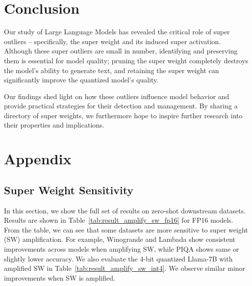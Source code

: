 \documentclass{article} %
\begin{document}
\section{Conclusion}

Our study of Large Language Models has revealed the critical role of super outliers -- specifically, the super weight and its induced super activation. Although these super outliers are small in number, identifying and preserving them is essential for model quality; pruning the super weight completely destroys the model's ability to generate text, and retaining the super weight can significantly improve the quantized model's quality.

Our findings shed light on how these outliers influence model behavior and provide practical strategies for their detection and management. By sharing a directory of super weights, we furthermore hope to inspire further research into their properties and implications.




\newpage
\appendix
\section{Appendix}



\subsection{Super Weight Sensitivity} \label{sec:sensitivity}
In this section, we show the full set of results on zero-shot downstream datasets. Results are shown in Table~\ref{tab:result_amplify_sw_fp16} for FP16 models. From the table, we can see that some datasets are more sensitive to super weight (SW) amplification. For example, Winogrande and Lambada show consistent improvements across models when amplifying SW, while PIQA shows same or slightly lower accuracy. We also evaluate the 4-bit quantized Llama-7B with amplified SW in Table~\ref{tab:result_amplify_sw_int4}. We observe similar minor improvements when SW is amplified. 
\end{document}

